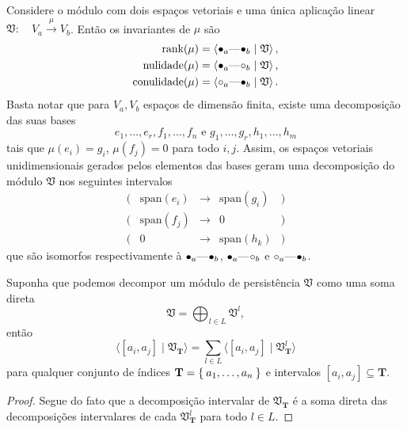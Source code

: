 \begin{ex}
    Considere o módulo com dois espaços vetoriais e uma única aplicação linear $\mathfrak{V} : \quad 
    V_a \xrightarrow{\mu} V_b$. Então os invariantes de $\mu$ são
    \begin{align*}
        \text{rank}(\mu)       & = \innerproduct{\qon{a} \qem \qon{b} \mid \mathfrak{V}}, \\
        \text{nulidade}(\mu)   & = \innerproduct{\qon{a} \qem \qoff{b} \mid \mathfrak{V}}, \\
        \text{conulidade}(\mu) & = \innerproduct{\qoff{a} \qem \qon{b} \mid \mathfrak{V}}.
    \end{align*}
    Basta notar que para $V_a, V_b$ espaços de dimensão finita, existe uma decomposição das suas bases 
    \begin{equation*}
        e_1, \dots, e_r, f_1, \dots, f_n \text{   e   } g_1, \dots, g_r, h_1, \dots, h_m
    \end{equation*}
    tais que $\mu(e_i) = g_i$, $\mu(f_j) = 0$ para todo $i,j$. Assim, os espaços vetoriais unidimensionais
    gerados pelos elementos das bases geram uma decomposição do módulo $\mathfrak{V}$ nos seguintes intervalos
    \[\begin{array}{ccccc}
        (&\text{span}(e_i) & \rightarrow &\text{span}(g_i)&) \\
        (&\text{span}(f_j) & \rightarrow &0               &) \\
        (& 0               & \rightarrow &\text{span}(h_k)&)
    \end{array}\]
    que são isomorfos respectivamente à $\qon{a} \qem \qon{b}$, $\qon{a} \qem \qoff{b}$ e 
    $\qoff{a} \qem \qon{b}$. 
\end{ex}

\begin{propo}
    Suponha que podemos decompor um módulo de persistência $\mathfrak{V}$ como uma soma direta
    \begin{equation*}
        \mathfrak{V} = \bigoplus_{l\in L} \mathfrak{V}^l,
    \end{equation*}
    então 
    \begin{equation*}
        \langle [a_i, a_j] \mid \mathfrak{V}_{\mathbf{T}} \rangle = \sum_{l\in L} \langle [a_i, a_j] 
        \mid \mathfrak{V}_{\mathbf{T}}^l \rangle
    \end{equation*}
    para qualquer conjunto de índices $\mathbf{T} = \Set{a_1, \dots, a_n}$ e intervalos $[a_i, a_j] \subseteq \mathbf{T}$.
\end{propo}
\begin{proof}
    Segue do fato que a decomposição intervalar de $\mathfrak{V}_{\mathbf{T}}$ é a soma direta das decomposições intervalares 
    de cada $\mathfrak{V}^l_{\mathbf{T}}$ para todo $l \in L$. 
\end{proof}

